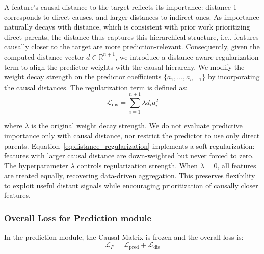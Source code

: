 \documentclass[sigconf, nonacm]{acmart}
\newcommand{\icde}[1]{{\color{black}#1}}
\newcommand{\kdd}[1]{{\color{black}#1}}
\newcommand{\syadd}[1]{{\color{black}#1}}
\newcommand{\syfix}[1]{{\color{black}#1}}
\begin{document}
\icde{
A feature's causal distance to the target reflects its importance: distance 1 corresponds to direct causes, and larger distances to indirect ones. 
As importance naturally decays with distance\cite{r:pearl2009,r:peters2017}, which is consistent with prior work prioritizing direct parents\cite{r:CASTLE,r:linear}, 
the distance thus captures this hierarchical structure, i.e., features causally closer to the target are more prediction-relevant.
}
Consequently, given the computed distance vector $d \in \mathbb{R}^{n+1}$, we introduce a distance-aware regularization term to \syadd{align the predictor weights with the causal hierarchy.} 
We modify the weight decay strength on the predictor coefficients $\{a_1, \dots, a_{n+1}\}$ by incorporating the causal distances. The regularization term is defined as:
\begin{equation}
    \mathcal{L}_{\text{dis}} = \sum_{i=1}^{n+1} \lambda d_i a_i^2
    \label{eq:distance_regularization}
\end{equation}

\noindent
where $\lambda$ is the original weight decay strength. 
\syadd{
We do not evaluate \syfix{predictive importance} only with causal distance, nor restrict the predictor to use only direct parents. 
Equation~\eqref{eq:distance_regularization} implements a soft regularization: features with larger causal distance are down-weighted but never forced to zero. 
The hyperparameter $\lambda$ controls regularization strength. 
When $\lambda = 0$, all features are treated equally, recovering data-driven aggregation. 
This preserves flexibility to exploit useful distant signals while encouraging prioritization of causally closer features.
}

\subsubsection{Overall Loss for Prediction \kdd{module}}
In the prediction \kdd{module}, the Causal Matrix is frozen and the overall loss is:
\begin{equation}
    \mathcal{L}_{P} = \mathcal{L}_{\text{pred}} + \mathcal{L}_{\text{dis}}
    \label{eq:total_prediction_loss}
\end{equation}
\end{document}
